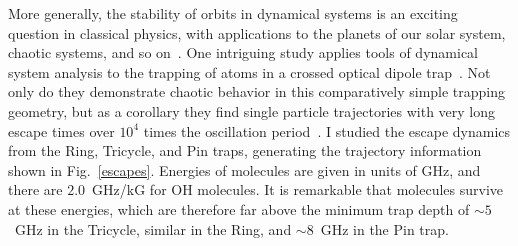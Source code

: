 \documentclass[defaultstyle,11pt]{thesis}
\begin{document}
More generally, the stability of orbits in dynamical systems is an exciting question in classical physics, with applications to the planets of our solar system, chaotic systems, and so on~\cite{dumas2014kam}.
One intriguing study applies tools of dynamical system analysis to the trapping of atoms in a crossed optical dipole trap~\cite{Gonzalez-Ferez2014}.
Not only do they demonstrate chaotic behavior in this comparatively simple trapping geometry, but as a corollary they find single particle trajectories with very long escape times over $10^4$ times the oscillation period~\citep[Fig.~11]{Gonzalez-Ferez2014}.
I studied the escape dynamics from the Ring, Tricycle, and Pin traps, generating the trajectory information shown in Fig.~\ref{escapes}.
Energies of molecules are given in units of GHz, and there are $2.0$~GHz/kG for OH molecules.
It is remarkable that molecules survive at these energies, which are therefore far above the minimum trap depth of $\sim5$~GHz in the Tricycle, similar in the Ring, and $\sim8$~GHz in the Pin trap.
\end{document}
